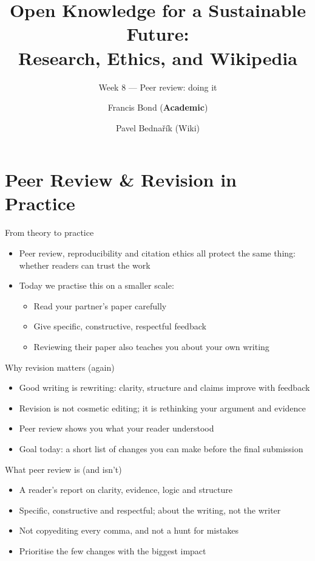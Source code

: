 \documentclass[aspectratio=169]{beamer}
\title[Workshop]{Open Knowledge for a Sustainable Future:\\ Research, Ethics, and Wikipedia}
\subtitle{Week 8 --- Peer review: doing it}
\author[Bond \& Bednařík]{Francis Bond (\textbf{Academic}) \and Pavel Bednařík (Wiki)}
\institute[UPOL \& Wikimedia]{Palacký University Olomouc \quad | \quad Wikimedia ČR}
\date{}
\begin{document}
\begin{frame}
  \titlepage
\end{frame}


\section{Peer Review \& Revision in Practice}

\begin{frame}{From theory to practice}
\begin{itemize}
  \item Peer review, reproducibility and citation ethics all protect the same thing: whether readers can trust the work
  \item Today we practise this on a smaller scale:
    \begin{itemize}
      \item Read your partner's paper carefully
      \item Give specific, constructive, respectful feedback
      \item Reviewing their paper also teaches you about your own writing
    \end{itemize}
\end{itemize}
\end{frame}


\begin{frame}{Why revision matters (again)}
\begin{itemize}
  \item Good writing is rewriting: clarity, structure and claims improve with feedback
  \item Revision is not cosmetic editing; it is rethinking your argument and evidence
  \item Peer review shows you what your reader understood
  \item Goal today: a short list of changes you can make before the final submission
\end{itemize}
\end{frame}

\begin{frame}{What peer review is (and isn't)}
\begin{itemize}
  \item A reader's report on clarity, evidence, logic and structure
  \item Specific, constructive and respectful; about the writing, not the writer
  \item Not copyediting every comma, and not a hunt for mistakes
  \item[$\Rightarrow$] Prioritise the few changes with the biggest impact
\end{itemize}
\end{frame}
\end{document}
